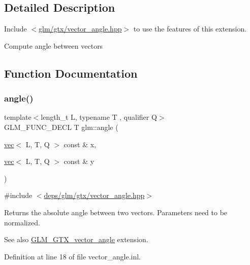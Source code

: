 \subsection{Detailed Description}
Include $<$\hyperlink{vector__angle_8hpp}{glm/gtx/vector\+\_\+angle.\+hpp}$>$ to use the features of this extension.

Compute angle between vectors 

\subsection{Function Documentation}
\mbox{\label{group__gtx__vector__angle_ga2e2917b4cb75ca3d043ac15ff88f14e1}} 
\subsubsection{\texorpdfstring{angle()}{angle()}}
{\footnotesize\ttfamily template$<$length\+\_\+t L, typename T , qualifier Q$>$ \\
G\+L\+M\+\_\+\+F\+U\+N\+C\+\_\+\+D\+E\+CL T glm\+::angle (\begin{DoxyParamCaption}\item[{\hyperlink{structglm_1_1vec}{vec}$<$ L, T, Q $>$ const \&}]{x,  }\item[{\hyperlink{structglm_1_1vec}{vec}$<$ L, T, Q $>$ const \&}]{y }\end{DoxyParamCaption})}



{\ttfamily \#include $<$\hyperlink{vector__angle_8hpp}{deps/glm/gtx/vector\+\_\+angle.\+hpp}$>$}

Returns the absolute angle between two vectors. Parameters need to be normalized. \begin{DoxySeeAlso}{See also}
\hyperlink{group__gtx__vector__angle}{G\+L\+M\+\_\+\+G\+T\+X\+\_\+vector\+\_\+angle} extension. 
\end{DoxySeeAlso}


Definition at line 18 of file vector\+\_\+angle.\+inl.

\mbox{\label{group__gtx__vector__angle_ga9556a803dce87fe0f42fdabe4ebba1d5}} 
